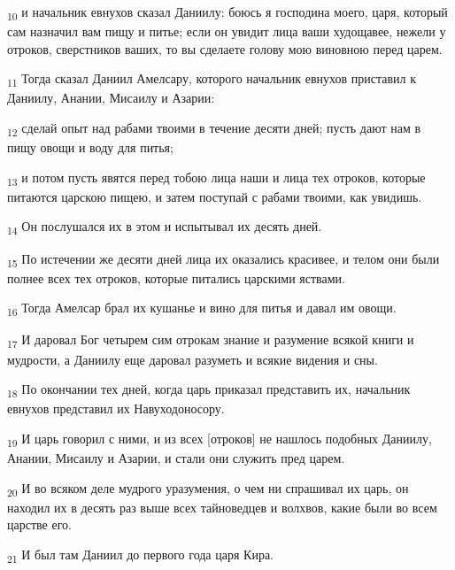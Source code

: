 \begin{tcolorbox}
\textsubscript{10} и начальник евнухов сказал Даниилу: боюсь я господина моего, царя, который сам назначил вам пищу и питье; если он увидит лица ваши худощавее, нежели у отроков, сверстников ваших, то вы сделаете голову мою виновною перед царем.
\end{tcolorbox}
\begin{tcolorbox}
\textsubscript{11} Тогда сказал Даниил Амелсару, которого начальник евнухов приставил к Даниилу, Анании, Мисаилу и Азарии:
\end{tcolorbox}
\begin{tcolorbox}
\textsubscript{12} сделай опыт над рабами твоими в течение десяти дней; пусть дают нам в пищу овощи и воду для питья;
\end{tcolorbox}
\begin{tcolorbox}
\textsubscript{13} и потом пусть явятся перед тобою лица наши и лица тех отроков, которые питаются царскою пищею, и затем поступай с рабами твоими, как увидишь.
\end{tcolorbox}
\begin{tcolorbox}
\textsubscript{14} Он послушался их в этом и испытывал их десять дней.
\end{tcolorbox}
\begin{tcolorbox}
\textsubscript{15} По истечении же десяти дней лица их оказались красивее, и телом они были полнее всех тех отроков, которые питались царскими яствами.
\end{tcolorbox}
\begin{tcolorbox}
\textsubscript{16} Тогда Амелсар брал их кушанье и вино для питья и давал им овощи.
\end{tcolorbox}
\begin{tcolorbox}
\textsubscript{17} И даровал Бог четырем сим отрокам знание и разумение всякой книги и мудрости, а Даниилу еще даровал разуметь и всякие видения и сны.
\end{tcolorbox}
\begin{tcolorbox}
\textsubscript{18} По окончании тех дней, когда царь приказал представить их, начальник евнухов представил их Навуходоносору.
\end{tcolorbox}
\begin{tcolorbox}
\textsubscript{19} И царь говорил с ними, и из всех [отроков] не нашлось подобных Даниилу, Анании, Мисаилу и Азарии, и стали они служить пред царем.
\end{tcolorbox}
\begin{tcolorbox}
\textsubscript{20} И во всяком деле мудрого уразумения, о чем ни спрашивал их царь, он находил их в десять раз выше всех тайноведцев и волхвов, какие были во всем царстве его.
\end{tcolorbox}
\begin{tcolorbox}
\textsubscript{21} И был там Даниил до первого года царя Кира.
\end{tcolorbox}
